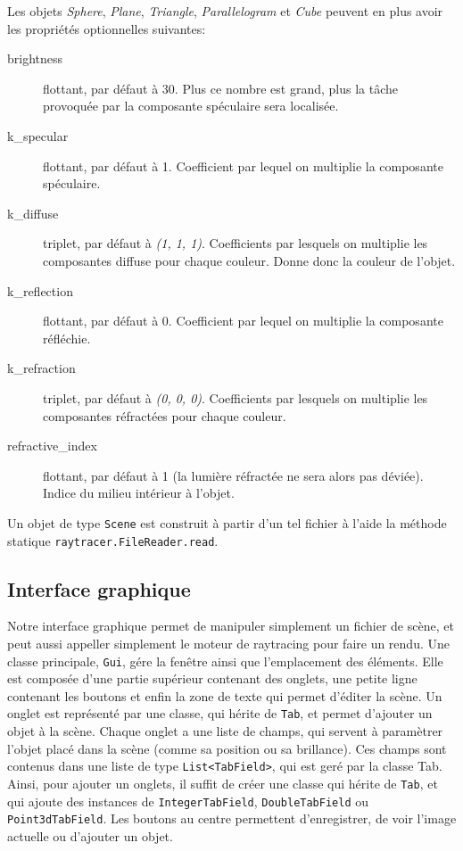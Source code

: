 \documentclass[a4paper]{article}
\begin{document}
    \bigskip
    Les objets \textit{Sphere}, \textit{Plane}, \textit{Triangle},
    \textit{Parallelogram} et \textit{Cube} peuvent en plus avoir les
    propriétés optionnelles suivantes:
    \begin{description}
      \item[brightness] flottant, par défaut à 30. Plus ce nombre est grand, plus la tâche provoquée par la composante spéculaire sera localisée.
      \item[k\_specular] flottant, par défaut à 1. Coefficient par lequel on multiplie la composante spéculaire.
      \item[k\_diffuse] triplet, par défaut à \textit{(1, 1, 1)}. Coefficients
        par lesquels on multiplie les composantes diffuse pour chaque couleur.
        Donne donc la couleur de l'objet.
      \item[k\_reflection] flottant, par défaut à 0. Coefficient par lequel on
        multiplie la composante réfléchie.
      \item[k\_refraction] triplet, par défaut à \textit{(0, 0, 0)}.
        Coefficients par lesquels on multiplie les composantes réfractées pour
        chaque couleur.
      \item[refractive\_index] flottant, par défaut à 1 (la lumière réfractée ne
        sera alors pas déviée). Indice du milieu intérieur à l'objet.
    \end{description}
    \bigskip
    Un objet de type \verb+Scene+ est construit à partir d'un tel fichier à
    l'aide la méthode statique \verb+raytracer.FileReader.read+.
  \subsection{Interface graphique}
    Notre interface graphique permet de manipuler simplement un fichier de scène, et peut aussi appeller simplement le moteur de raytracing pour faire un rendu.
    Une classe principale, \verb+Gui+, gére la fenêtre ainsi que l'emplacement des éléments.
    Elle est composée d'une partie supérieur contenant des onglets, une petite ligne contenant les boutons et enfin la zone de texte qui permet d'éditer la scène.
    Un onglet est représenté par une classe, qui hérite de \verb+Tab+, et permet d'ajouter un objet à la scène.
    Chaque onglet a une liste de champs, qui servent à paramètrer l'objet placé dans la scène (comme sa position ou sa brillance).
    Ces champs sont contenus dans une liste de type \verb+List<TabField>+,  qui est geré par la classe Tab.
    Ainsi, pour ajouter un onglets, il suffit de créer une classe qui hérite de \verb+Tab+, et qui ajoute des instances de \verb+IntegerTabField+, \verb+DoubleTabField+ ou \verb+Point3dTabField+.
    Les boutons au centre permettent d'enregistrer, de voir l'image actuelle ou d'ajouter un objet.
    
\end{document}

